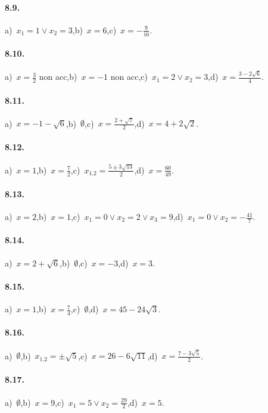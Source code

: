 \paragraph{8.9.} a)~$x_1=1\vee x_2=3$,\quad b)~$x=6$,\quad c)~$x=-\frac 9{16}$.

\paragraph{8.10.} a)~$x=\frac 3 2$ non acc,\quad b)~$x=-1$ non acc,\quad c)~$x_1=2\vee x_2=3$,\quad d)~$x=\frac{3-2\sqrt 6} 4$.

\paragraph{8.11.} a)~$x=-1-\sqrt 6$,\quad b)~$\emptyset $,\quad c)~$x=\frac{2+\sqrt 7} 2$,\quad d)~$x=4+2\sqrt 2$.

\paragraph{8.12.} a)~$x=1$,\quad b)~$x=\frac 7 2$,\quad c)~$x_{1\text{,}2}=\frac{5\pm 3\sqrt{13}} 2$,\quad d)~$x=\frac{60}{49}$.

\paragraph{8.13.} a)~$x=2$,\quad b)~$x=1$,\quad c)~$x_1=0\vee x_2=2\vee x_3=9$,\quad d)~$x_1=0\vee x_2=-\frac{41} 7$.

\paragraph{8.14.} a)~$x=2+\sqrt 6$,\quad b)~$\emptyset $,\quad c)~$x=-3$,\quad d)~$x=3$.

\paragraph{8.15.} a)~$x=1$,\quad b)~$x=\frac{7}{4}$,\quad c)~$\emptyset$,\quad d)~$x=45-24\sqrt{3}$.

\paragraph{8.16.} a)~$\emptyset $,\quad b)~$x_{1\text{,}2}=\pm \sqrt 5$,\quad c)~$x=26-6\sqrt{11}$,\quad d)~$x=\frac{7-3\sqrt 5} 2$.

\paragraph{8.17.} a)~$\emptyset$,\quad b)~$x=9$,\quad c)~$x_1=5\vee x_2=\frac{29}{2}$,\quad d)~$x=5$.

